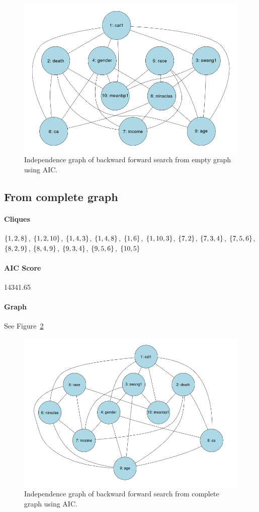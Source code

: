 \documentclass[12pt]{article}
\theoremstyle{definition}
\begin{document}
\begin{figure}[H]
    \centering
    \includegraphics[width=0.8\linewidth]{f1.png}
    \caption{Independence graph of backward forward search from empty graph using AIC.}
\label{fig:f1}
\end{figure}

\subsection*{From complete graph}
\paragraph{Cliques}
$\set{1,2,8}$, $\set{1,2,10}$, $\set{1,4,3}$, $\set{1,4,8}$, $\set{1,6}$, $\set{1,10,3}$,
$\set{7,2}$, $\set{7,3,4}$, $\set{7,5,6}$, $\set{8,2,9}$, $\set{8,4,9}$, $\set{9,3,4}$,
$\set{9,5,6}$, $\set{10,5}$

\paragraph{AIC Score} 14341.65

\paragraph{Graph} See Figure~\ref{fig:f2}

\begin{figure}[H]
    \centering
    \includegraphics[width=0.8\linewidth]{f2.png}
    \caption{Independence graph of backward forward search from complete graph using AIC.}
\label{fig:f2}
\end{figure}
\end{document}
